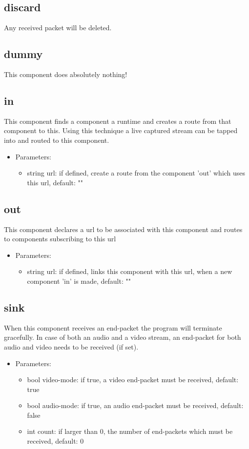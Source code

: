 \subsection{discard}
Any received packet will be deleted.
\subsection{dummy}
This component does absolutely nothing!
\subsection{in}
This component finds a component a runtime and creates a route from that component to this. Using this technique a live captured stream can be tapped into and routed to this component.
\begin{itemize}
\item Parameters:
\begin{itemize}
\item string url: if defined, create a route from the component 'out' which uses this url, default: ""
\end{itemize}
\end{itemize}
\subsection{out}
This component declares a url to be associated with this component and routes to components subscribing to this url
\begin{itemize}
\item Parameters:
\begin{itemize}
\item string url: if defined, links this component with this url, when a new component 'in' is made, default: ""
\end{itemize}
\end{itemize}
\subsection{sink}
When this component receives an end-packet the program will terminate gracefully. In case of both an audio and a video stream, an end-packet for both audio and video needs to be received (if set).
\begin{itemize}
\item Parameters:
\begin{itemize}
\item bool video-mode: if true, a video end-packet must be received, default: true
\item bool audio-mode: if true, an audio end-packet must be received, default: false
\item int count: if larger than 0, the number of end-packets which must be received, default: 0
\end{itemize}
\end{itemize}
